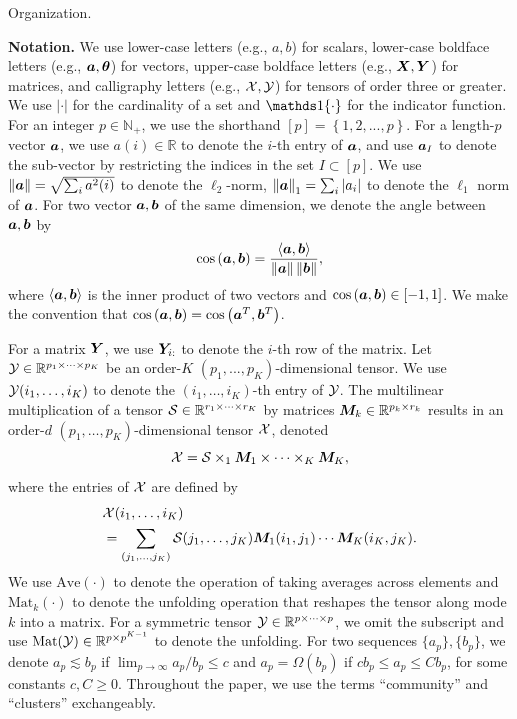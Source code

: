 \documentclass[lettersize,journal]{IEEEtran}
\theoremstyle{definition}
\theoremstyle{definition}
\newcommand{\of}[1]{\left(#1\right)}
\newcommand{\offf}[1]{\left\{#1\right\}}
\newcommand{\ang}[1]{\left\langle#1\right\rangle}
\def\fixme#1#2{\textbf{\color{red}[FIXME (#1): #2]}}
\begin{document}
{
\color{red}
Organization.
}

{\bf Notation.} We use lower-case letters (e.g., $a,b$) for scalars, lower-case boldface letters (e.g., $\bm{a},\boldsymbol{\theta}$) for vectors, upper-case boldface letters (e.g., $\bm X,\bm Y$) for matrices, and calligraphy letters (e.g., $\mathcal{X},\mathcal{Y}$) for tensors of order three or greater. We use $|\cdot|$ for the cardinality of a set and $\ind\{\cdot\}$ for the indicator function. For an integer $p\in\mathbb{N}_{+}$, we use the shorthand $[p]= \offf{1,2,...,p}$. For a length-$p$ vector $\bm{a}$, we use $a(i)\in\mathbb{R}$ to denote the $i$-th entry of $\bm{a}$, and use $\bm{a}_{I}$ to denote the sub-vector by restricting the indices in the set $I\subset [p]$.  We use  $\left\lVert\bm{a}\right\rVert=\sqrt{\sum_{i}a^2(i)}$ to denote the $\ell_2$-norm, $\left\lVert\bm{a}\right\rVert_1=\sum_i |a_i|$ to denote the $\ell_1$ norm of $\bm{a}$. For two vector $\bm{a}, \bm{b}$ of the same dimension, we denote the angle between $\bm{a}, \bm{b}$ by 
\begin{equation}
    \cos \of{\ma, \mb} = \frac{\ang{ \ma, \mb}}{ \onorm{\ma} \onorm{\mb} },
\end{equation}
where $\ang{\ma,\mb}$ is the inner product of two vectors and $\cos \of{\ma, \mb} \in [-1,1]$. We make the convention that $\cos \of{\ma, \mb} = \cos \of{\ma^T, \mb^T}$.

For a matrix $\bm Y$, we use $\bm Y_{i:}$ to  denote the $i$-th row of the matrix. Let $\mathcal{Y}  \in \mathbb{R}^{p_1 \times \cdots \times p_K}$ be an order-$K$ $(p_1,...,p_K)$-dimensional tensor. We use $\mathcal{Y}(i_1,\ldots,i_K)$ to denote the $(i_1,\ldots,i_K)$-th entry of $\mathcal{Y}$. The multilinear multiplication of a tensor $\mathcal{S}\in \mathbb{R}^{r_1\times \cdots \times r_K}$ by matrices $\bm M_k \in\mathbb{R}^{p_k\times r_k}$ results in an order-$d$ $(p_1,\ldots,p_K)$-dimensional tensor $\mathcal{X}$, denoted
\[
\mathcal{X}=\mathcal{S} \times_1 \bm M_1 \times \cdots \times_K \bm M_K,
\]
where the entries of $\mathcal{X}$ are defined by
\begin{align}
    &\mathcal{X}(i_1,\ldots, i_K)\\
    &=\sum_{(j_1,\ldots,j_K)}\mathcal{S}(j_1,\ldots,j_K)\bm M_1(i_1,j_1)\cdots \bm M_K(i_K,j_K).
\end{align} 
 We use $\text{Ave}(\cdot)$ to denote the operation of taking averages across elements and $\text{Mat}_k(\cdot)$ to denote the unfolding operation that reshapes the tensor along mode $k$ into a matrix. For a symmetric tensor $\mathcal{Y}\in\mathbb{R}^{p\times \cdots \times p}$, we omit the subscript and use $\text{Mat}(\mathcal{Y})\in\mathbb{R}^{p\times p^{K-1}}$ to denote the unfolding. For two sequences $\{a_p\}, \{b_p\}$, we denote $a_p\lesssim b_p$ if $\lim_{p\to\infty} a_p/b_p \leq c$ and $a_p = \Omega(b_p)$ if $c b_p \leq a_p \leq C b_p$, for some constants $c, C\geq 0$. Throughout the paper, we use the terms ``community'' and ``clusters'' exchangeably. 
\end{document}
